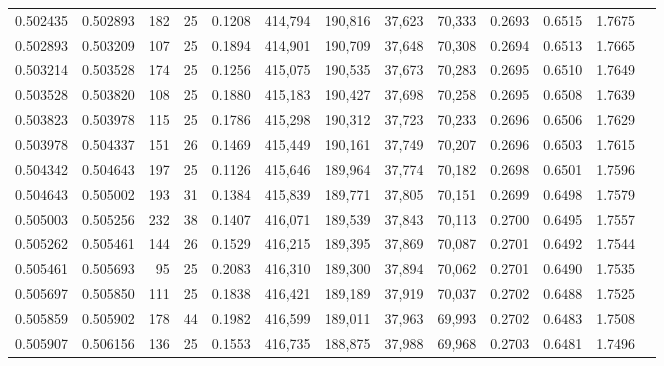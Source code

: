 \begin{tabular}{rrrrrrrrrrrrr}
0.502435 & 0.502893 &   182 &  25 &                                     0.1208 & 414,794 & 190,816 &  37,623 &  70,333 & 0.2693 & 0.6515 & 1.7675 \\
0.502893 & 0.503209 &   107 &  25 &                                     0.1894 & 414,901 & 190,709 &  37,648 &  70,308 & 0.2694 & 0.6513 & 1.7665 \\
0.503214 & 0.503528 &   174 &  25 &                                     0.1256 & 415,075 & 190,535 &  37,673 &  70,283 & 0.2695 & 0.6510 & 1.7649 \\
0.503528 & 0.503820 &   108 &  25 &                                     0.1880 & 415,183 & 190,427 &  37,698 &  70,258 & 0.2695 & 0.6508 & 1.7639 \\
0.503823 & 0.503978 &   115 &  25 &                                     0.1786 & 415,298 & 190,312 &  37,723 &  70,233 & 0.2696 & 0.6506 & 1.7629 \\
0.503978 & 0.504337 &   151 &  26 &                                     0.1469 & 415,449 & 190,161 &  37,749 &  70,207 & 0.2696 & 0.6503 & 1.7615 \\
0.504342 & 0.504643 &   197 &  25 &                                     0.1126 & 415,646 & 189,964 &  37,774 &  70,182 & 0.2698 & 0.6501 & 1.7596 \\
0.504643 & 0.505002 &   193 &  31 &                                     0.1384 & 415,839 & 189,771 &  37,805 &  70,151 & 0.2699 & 0.6498 & 1.7579 \\
0.505003 & 0.505256 &   232 &  38 &                                     0.1407 & 416,071 & 189,539 &  37,843 &  70,113 & 0.2700 & 0.6495 & 1.7557 \\
0.505262 & 0.505461 &   144 &  26 &                                     0.1529 & 416,215 & 189,395 &  37,869 &  70,087 & 0.2701 & 0.6492 & 1.7544 \\
0.505461 & 0.505693 &    95 &  25 &                                     0.2083 & 416,310 & 189,300 &  37,894 &  70,062 & 0.2701 & 0.6490 & 1.7535 \\
0.505697 & 0.505850 &   111 &  25 &                                     0.1838 & 416,421 & 189,189 &  37,919 &  70,037 & 0.2702 & 0.6488 & 1.7525 \\
0.505859 & 0.505902 &   178 &  44 &                                     0.1982 & 416,599 & 189,011 &  37,963 &  69,993 & 0.2702 & 0.6483 & 1.7508 \\
0.505907 & 0.506156 &   136 &  25 &                                     0.1553 & 416,735 & 188,875 &  37,988 &  69,968 & 0.2703 & 0.6481 & 1.7496 \\

\end{tabular}
